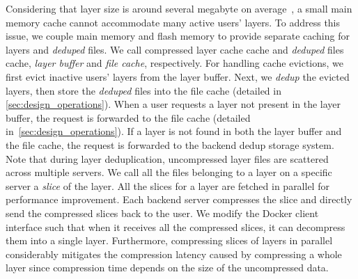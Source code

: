 Considering that layer size is around several megabyte on
average~\cite{dockerworkload}, a small main memory cache cannot accommodate
many active users' layers. To address this issue, we couple main memory and
flash memory to provide separate caching for layers and \emph{deduped} files.
We call compressed layer cache cache and \emph{deduped} files cache,
\emph{layer buffer} and \emph{file cache}, respectively.
For handling
cache evictions, we first evict inactive users' layers from the layer buffer.
Next, we \emph{dedup} the evicted layers, then store the \emph{deduped} files
into the file cache (detailed in \cref{sec:design_operations}). 
When a user requests a
layer not present in the layer buffer, the request is forwarded to the
file cache (detailed in~\cref{sec:design_operations}). 
If a layer is not found in both the layer buffer and the
file cache, the request is forwarded to the backend dedup storage system.
Note that during layer deduplication, uncompressed layer files are
scattered across multiple servers.
We call all the files belonging to a layer on a specific server a
\emph{slice} of the layer.
All the slices for a layer are fetched in parallel for performance improvement.
%
%
Each backend server compresses the slice and directly send the compressed slices back to the user.
We modify the Docker client
interface such that when it receives all the compressed slices, it can
decompress them into a single layer. 
Furthermore, compressing slices
of layers in parallel considerably mitigates the compression latency caused by
compressing a whole layer since compression time depends on the size of the
uncompressed data.




 
